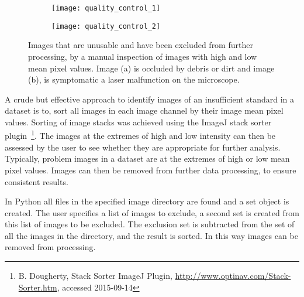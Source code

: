 \begin{figure}[htbp]\centering
	\begin{subfigure}[b]{0.49\linewidth} %
		\centering
		\texttt{[image: quality\_control\_1]}
		\caption{}
		\label{figure:image_processing:quality_control_1}
		\vspace{1ex}
	\end{subfigure}
	\begin{subfigure}[b]{0.49\linewidth} %
		\centering
		\texttt{[image: quality\_control\_2]}
		\caption{}
		\label{figure:image_processing:quality_control_2}
		\vspace{1ex}
	\end{subfigure}
\caption[Excluded images]{Images that are unusable and have been excluded from further processing, by a manual inspection of images with high and low mean pixel values. Image (a) is occluded by debris or dirt and image (b), is symptomatic a laser malfunction on the microscope.}
\label{figure:image_processing:quality_control}
\end{figure}

A crude but effective approach to identify images of an insufficient standard in a dataset is to, sort all images in each image channel by their image mean pixel values. Sorting of image stacks was achieved using the ImageJ stack sorter plugin~\footnote{B. Dougherty, Stack Sorter ImageJ Plugin, \url{http://www.optinav.com/Stack-Sorter.htm}, accessed 2015-09-14}. The images at the extremes of high and low intensity can then be assessed by the user to see whether they are appropriate for further analysis. Typically, problem images in a dataset are at the extremes of high or low mean pixel values. Images can then be removed from further data processing, to ensure consistent results.

In Python all files in the specified image directory are found and a set object is created. The user specifies a list of images to exclude, a second set is created from this list of images to be excluded. The exclusion set is subtracted from the set of all the images in the directory, and the result is sorted. In this way images can be removed from processing.

